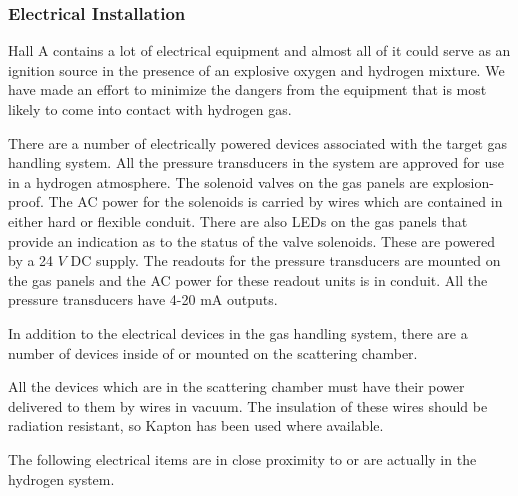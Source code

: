 \begin{safetyen}{10}{5}
\subsubsection{ Electrical Installation}

Hall A contains a lot of electrical equipment and almost all of it
could serve as an ignition source in the presence of an explosive
oxygen and hydrogen mixture. We have made an effort to minimize the dangers
from the equipment that is most likely to come into contact with
hydrogen gas.

There are a number of electrically powered devices associated with the
target gas handling system.
All the pressure transducers in the system are approved
for use in a hydrogen atmosphere. 
The solenoid valves on the gas panels are explosion-proof.
The AC power for the solenoids is
carried by wires which are contained in either hard or flexible conduit.
There are also LEDs on the gas panels that provide an indication as to the
status of the valve solenoids. These are powered by a 24 $V$ DC supply.
The readouts for the pressure transducers are
mounted on the gas panels and the AC power for these readout units
is in conduit. All the pressure transducers have 4-20 mA outputs.

In addition to the electrical devices in the gas handling system,
there are a number of devices inside of or mounted on the scattering
chamber.

All the devices which are in the scattering chamber must have
their power delivered to them by wires in vacuum. The
insulation of these wires should be radiation resistant, so Kapton
has been used where available.

The following electrical items are in close proximity to
or are actually in the hydrogen system.


\end{safetyen}
